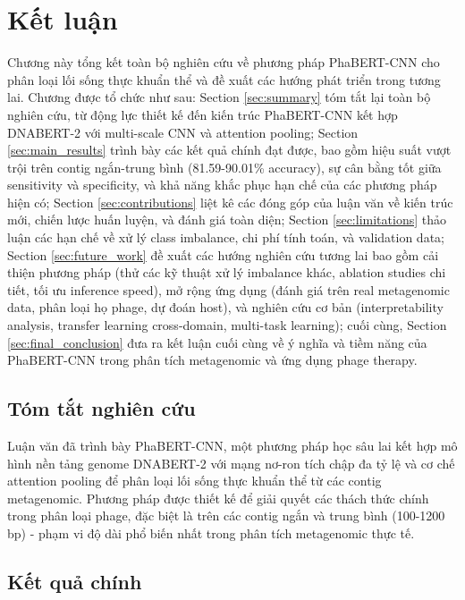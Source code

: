 \chapter{Kết luận}
\label{chap:conclusion}

Chương này tổng kết toàn bộ nghiên cứu về phương pháp PhaBERT-CNN cho phân loại lối sống thực khuẩn thể và đề xuất các hướng phát triển trong tương lai. Chương được tổ chức như sau: Section \ref{sec:summary} tóm tắt lại toàn bộ nghiên cứu, từ động lực thiết kế đến kiến trúc PhaBERT-CNN kết hợp DNABERT-2 với multi-scale CNN và attention pooling; Section \ref{sec:main_results} trình bày các kết quả chính đạt được, bao gồm hiệu suất vượt trội trên contig ngắn-trung bình (81.59-90.01\% accuracy), sự cân bằng tốt giữa sensitivity và specificity, và khả năng khắc phục hạn chế của các phương pháp hiện có; Section \ref{sec:contributions} liệt kê các đóng góp của luận văn về kiến trúc mới, chiến lược huấn luyện, và đánh giá toàn diện; Section \ref{sec:limitations} thảo luận các hạn chế về xử lý class imbalance, chi phí tính toán, và validation data; Section \ref{sec:future_work} đề xuất các hướng nghiên cứu tương lai bao gồm cải thiện phương pháp (thử các kỹ thuật xử lý imbalance khác, ablation studies chi tiết, tối ưu inference speed), mở rộng ứng dụng (đánh giá trên real metagenomic data, phân loại họ phage, dự đoán host), và nghiên cứu cơ bản (interpretability analysis, transfer learning cross-domain, multi-task learning); cuối cùng, Section \ref{sec:final_conclusion} đưa ra kết luận cuối cùng về ý nghĩa và tiềm năng của PhaBERT-CNN trong phân tích metagenomic và ứng dụng phage therapy.

\section{Tóm tắt nghiên cứu}

Luận văn đã trình bày PhaBERT-CNN, một phương pháp học sâu lai kết hợp mô hình nền tảng genome DNABERT-2 với mạng nơ-ron tích chập đa tỷ lệ và cơ chế attention pooling để phân loại lối sống thực khuẩn thể từ các contig metagenomic. Phương pháp được thiết kế để giải quyết các thách thức chính trong phân loại phage, đặc biệt là trên các contig ngắn và trung bình (100-1200 bp) - phạm vi độ dài phổ biến nhất trong phân tích metagenomic thực tế.

\section{Kết quả chính}

